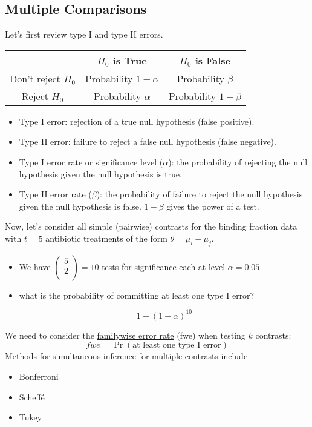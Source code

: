 \subsection*{Multiple Comparisons}
Let's first review type I and type II errors.
\begin{table}[H]
	\renewcommand{\arraystretch}{1.5}
	\centering
	\begin{tabular}{c|c|c}
		\toprule
		& $H_0$ is True & $H_0$ is False\\
		\hline
		Don't reject $H_0$ & Probability $1 - \alpha$ & Probability $\beta$\\
		Reject $H_0$ & Probability $\alpha$ & Probability $1 - \beta$\\
		\bottomrule
	\end{tabular}
\end{table}
\begin{itemize}
	\item Type I error: rejection of a true null hypothesis (false positive).
	\item Type II error: failure to reject a false null hypothesis (false negative).
	\item Type I error rate or significance level ($\alpha$): the probability of rejecting the null hypothesis given the null hypothesis is true.
	\item Type II error rate ($\beta$): the probability of failure to reject the null hypothesis given the null hypothesis is false.  $1 - \beta$ gives the power of a test.
\end{itemize}

Now, let's consider all simple (pairwise) contrasts for the binding fraction data with $t=5$ antibiotic treatments of the form $\theta = \mu_i - \mu_j$.
\begin{itemize}
	\item We have $\left( \begin{array}{c}
		5\\ 2\\
	\end{array} \right) = 10$ tests for significance each at level $\alpha = 0.05$
	\item what is the probability of committing at least one type I error?
	    \begin{pf}
	    	$$
	    	1 - (1 - \alpha)^{10}
	    	$$
	    \end{pf}
\end{itemize}

We need to consider the \underline{familywise error rate} (fwe) when testing $k$ contrasts:
$$
fwe = \Pr(\mbox{at least one type I error})
$$
Methods for simultaneous inference for multiple contrasts include
\begin{itemize}
	\item Bonferroni
	\item Scheff\'e
	\item Tukey
\end{itemize}

